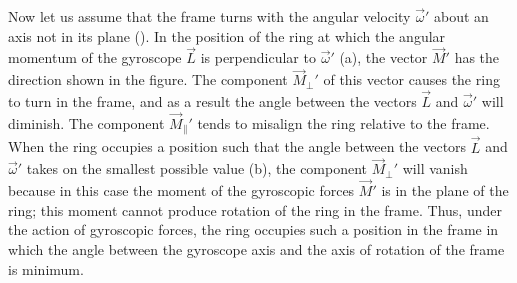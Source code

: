 Now let us assume that the frame turns with the angular velocity $\vec{\omega}'$ about an axis not in its plane (). In the position of the ring at which the angular momentum of the gyroscope $\vec{L}$ is perpendicular to $\vec{\omega}'$ (a), the vector $\vec{M}'$ has the direction shown in the figure. The component $\vec{M}_{\perp}'$ of this vector causes the ring to turn in the frame, and as a result the angle between the vectors $\vec{L}$ and $\vec{\omega}'$ will diminish. The component $\vec{M}_{\parallel}'$ tends to misalign the ring relative to the frame. When the ring occupies a position such that the angle between the vectors $\vec{L}$ and $\vec{\omega}'$ takes on the smallest possible value (b), the component $\vec{M}_{\perp}'$ will vanish because in this case the moment of the gyroscopic forces $\vec{M}'$ is in the plane of the ring; this moment cannot produce rotation of the ring in the frame. Thus, under the action of gyroscopic forces, the ring occupies such a position in the frame in which the angle between the gyroscope axis and the axis of rotation of the frame is minimum.

